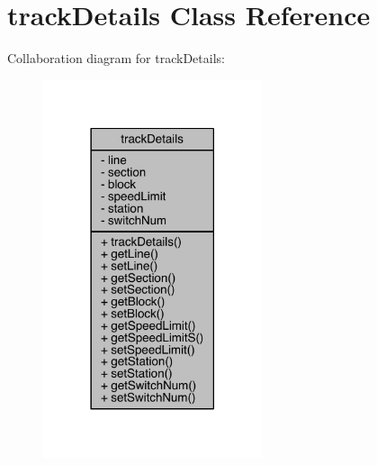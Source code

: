 \hypertarget{classtrackDetails}{}\section{track\+Details Class Reference}
\label{classtrackDetails}


Collaboration diagram for track\+Details\+:
\nopagebreak
\begin{figure}[H]
\begin{center}
\leavevmode
\includegraphics[width=182pt]{classtrackDetails__coll__graph}
\end{center}
\end{figure}
